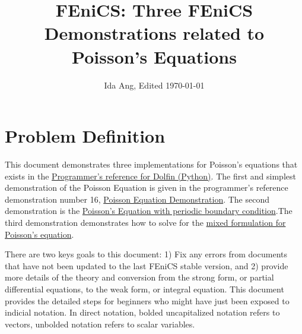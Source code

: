 \documentclass[12pt,3p]{article}
\begin{document}
\title{\Large{FEniCS: Three FEniCS Demonstrations related to Poisson's Equations} \vspace{-5ex}}
\author{Ida Ang, Edited \today}
\date{\vspace{-5ex}}
\maketitle

\tableofcontents
\newpage
\section{Problem Definition}
\vspace{-2ex}
This document demonstrates three implementations for Poisson's equations that exists in the \href{https://fenicsproject.org/olddocs/dolfin/1.4.0/python/demo/index.html}{Programmer's reference for Dolfin (Python)}. The first and simplest demonstration of the Poisson Equation is given in the programmer's reference demonstration number 16, \href{https://fenicsproject.org/olddocs/dolfin/1.3.0/python/demo/documented/poisson/python/documentation.html}{Poisson Equation Demonstration}. The second demonstration is the \href{https://fenicsproject.org/olddocs/dolfin/1.4.0/python/demo/documented/periodic/python/documentation.html}{Poisson's Equation with periodic boundary condition}.The third demonstration demonstrates how to solve for the \href{https://fenicsproject.org/olddocs/dolfin/1.4.0/python/demo/documented/mixed-poisson/python/documentation.html}{mixed formulation for Poisson's equation}. 

There are two keys goals to this document: 1) Fix any errors from documents that have not been updated to the last FEniCS stable version, and 2) provide more details of the theory and conversion from the strong form, or partial differential equations, to the weak form, or integral equation. This document provides the detailed steps for beginners who might have just been exposed to indicial notation. In direct notation, bolded uncapitalized notation refers to vectors, unbolded notation refers to scalar variables.
 
\end{document}
